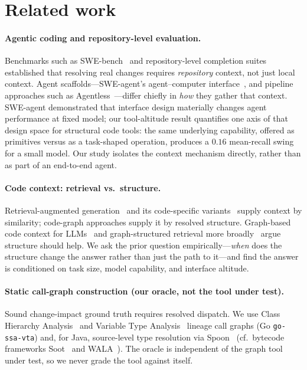 \documentclass[11pt]{article}
\newcommand{\code}[1]{\texttt{#1}}
\begin{document}
\section{Related work}
\label{sec:related}

\paragraph{Agentic coding and repository-level evaluation.}
Benchmarks such as SWE-bench~\cite{swebench} and repository-level completion
suites~\cite{repobench,repocoder} established that resolving real changes requires
\emph{repository} context, not just local context. Agent scaffolds---SWE-agent's
agent--computer interface~\cite{sweagent}, and pipeline approaches such as
Agentless~\cite{agentless}---differ chiefly in \emph{how} they gather that
context. SWE-agent demonstrated that interface design materially changes agent
performance at fixed model; our tool-altitude result quantifies one axis of that
design space for structural code tools: the same underlying capability, offered
as primitives versus as a task-shaped operation, produces a $0.16$ mean-recall
swing for a small model. Our study isolates the context mechanism directly,
rather than as part of an end-to-end agent.

\paragraph{Code context: retrieval vs.\ structure.}
Retrieval-augmented generation~\cite{rag} and its code-specific
variants~\cite{repocoder} supply context by similarity; code-graph approaches
supply it by resolved structure. Graph-based code context for
LLMs~\cite{codexgraph} and graph-structured retrieval more
broadly~\cite{graphrag} argue structure should help. We ask the prior question
empirically---\emph{when} does the structure change the answer rather than just
the path to it---and find the answer is conditioned on task size, model
capability, and interface altitude.

\paragraph{Static call-graph construction (our oracle, not the tool under test).}
Sound change-impact ground truth requires resolved dispatch. We use Class
Hierarchy Analysis~\cite{cha} and Variable Type Analysis~\cite{vta} lineage call
graphs (Go \code{go-ssa-vta}) and, for Java, source-level type resolution via
Spoon~\cite{spoon} (cf.\ bytecode frameworks Soot~\cite{soot} and
WALA~\cite{wala}). The oracle is independent of the graph tool
under test, so we never grade the tool against itself.
\end{document}
